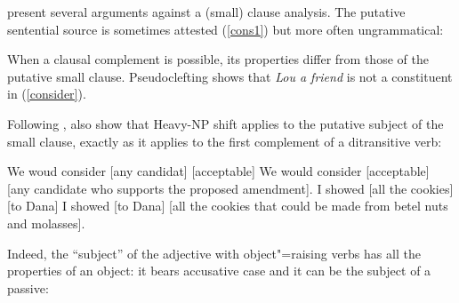 \documentclass[output=paper
	        ,collection
	        ,collectionchapter
 	        ,biblatex
                ,babelshorthands
                ,newtxmath
                ,draftmode
                ,colorlinks, citecolor=brown
]{langscibook}
\begin{document}


\citet[Chapter~3]{PollardandSag1994} present several arguments against a (small) clause analysis. The putative sentential source is sometimes attested (\ref{cons1}) but more often ungrammatical:

	
\eal
{}
\zl

	
When a clausal complement is possible, its properties differ from those of the putative small clause. Pseudoclefting shows that \textit{Lou a friend} is not a constituent in (\ref{consider}).

\eal
{}
\zl

Following \citet{Bresnan82c}, \citet[113]{PollardandSag1994} also show that Heavy-NP shift applies to the putative subject of the small clause, exactly as it applies to the first complement of a ditransitive verb:

\begin{exe}
\ex \begin{xlist}
\ex   We woud consider [any candidat] [acceptable]
\ex We would consider [acceptable]  [any candidate who supports the proposed amendment].
\ex   I showed [all the cookies] [to Dana]
\ex I showed [to Dana]  [all the cookies that could be made from betel nuts and molasses].  
\end{xlist}

\end{exe}

 Indeed, the ``subject'' of the adjective with object"=raising verbs has all the properties of an
 object: it bears accusative case and it can be the subject of a passive:
\end{document}
